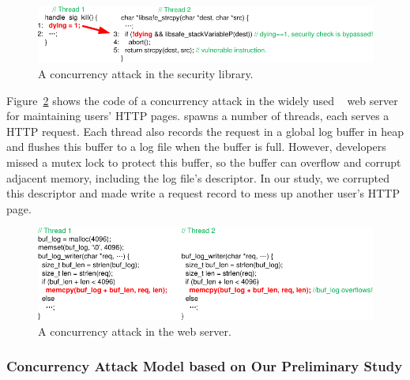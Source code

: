 \begin{figure}[h]
\vspace{-.1in}
\centering
\includegraphics[width=0.8\columnwidth]{figures/libsafe}
\vspace{-.1in}
\caption{{A concurrency attack in the \libsafe security library.}} 
\label{fig:libsafe}
\vspace{-.15in}
\end{figure}

Figure~\ref{fig:apache} shows the code of a concurrency attack in 
the widely used \apache~\cite{apache} web server for maintaining users' HTTP 
pages. \apache spawns a number of threads, each serves a HTTP request. Each 
thread also records the request in a global log buffer in heap and flushes this 
buffer to a log file when the buffer is full. However, developers missed a 
mutex lock to protect this buffer, so the buffer can overflow and corrupt 
adjacent memory, including the log file's descriptor. In our study, we 
corrupted this descriptor and made \apache write a request record to mess up 
another user's HTTP page.

\begin{figure}[h]
\vspace{-.05in}
\centering
\includegraphics[width=0.8\columnwidth]{figures/apache}
\vspace{-.1in}
\caption{{A concurrency attack in the \apache web server.}} \label{fig:apache}
\vspace{-.15in}
\end{figure}



\vspace{-.15in}\subsubsection{Concurrency Attack Model based on Our 
Preliminary Study} 
\label{sec:attack-phase}\vspace{-.075in}


